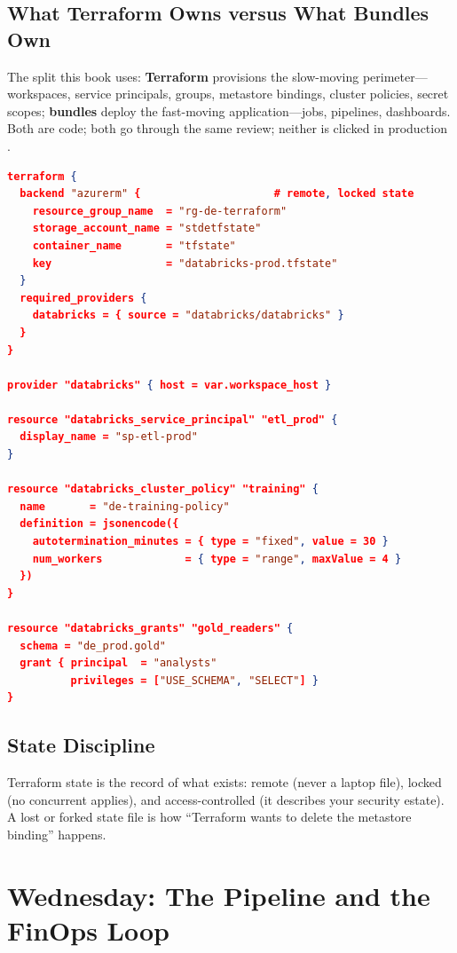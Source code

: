 \subsection{What Terraform Owns versus What Bundles Own}
The split this book uses: \textbf{Terraform} provisions the slow-moving perimeter---workspaces, service principals, groups, metastore bindings, cluster policies, secret scopes; \textbf{bundles} deploy the fast-moving application---jobs, pipelines, dashboards. Both are code; both go through the same review; neither is clicked in production \cite{terraformDatabricks}.

\begin{lstlisting}[language=json,caption={Terraform perimeter for the prod target.},label={lst:ch23-terraform}]
terraform {
  backend "azurerm" {                     # remote, locked state
    resource_group_name  = "rg-de-terraform"
    storage_account_name = "stdetfstate"
    container_name       = "tfstate"
    key                  = "databricks-prod.tfstate"
  }
  required_providers {
    databricks = { source = "databricks/databricks" }
  }
}

provider "databricks" { host = var.workspace_host }

resource "databricks_service_principal" "etl_prod" {
  display_name = "sp-etl-prod"
}

resource "databricks_cluster_policy" "training" {
  name       = "de-training-policy"
  definition = jsonencode({
    autotermination_minutes = { type = "fixed", value = 30 }
    num_workers             = { type = "range", maxValue = 4 }
  })
}

resource "databricks_grants" "gold_readers" {
  schema = "de_prod.gold"
  grant { principal  = "analysts"
          privileges = ["USE_SCHEMA", "SELECT"] }
}
\end{lstlisting}

\subsection{State Discipline}
Terraform state is the record of what exists: remote (never a laptop file), locked (no concurrent applies), and access-controlled (it describes your security estate). A lost or forked state file is how ``Terraform wants to delete the metastore binding'' happens.

\section{Wednesday: The Pipeline and the FinOps Loop}
